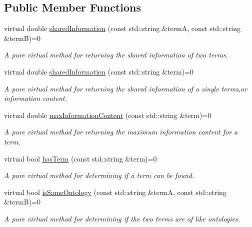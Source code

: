 \subsection*{Public Member Functions}
\begin{DoxyCompactItemize}
\item 
virtual double \hyperlink{classSharedInformationInterface_a76e8858eb598442b86b0fd3be1c519e7}{shared\+Information} (const std\+::string \&termA, const std\+::string \&termB)=0
\begin{DoxyCompactList}\small\item\em A pure virtual method for returning the shared information of two terms. \end{DoxyCompactList}\item 
virtual double \hyperlink{classSharedInformationInterface_aba102c0e44fbc098baef6074f1eb37b6}{shared\+Information} (const std\+::string \&term)=0
\begin{DoxyCompactList}\small\item\em A pure virtual method for returning the shared information of a single terms,or information content. \end{DoxyCompactList}\item 
virtual double \hyperlink{classSharedInformationInterface_a7356ba99509458777972ce0f00ebd999}{max\+Information\+Content} (const std\+::string \&term)=0
\begin{DoxyCompactList}\small\item\em A pure virtual method for returning the maximum information content for a term. \end{DoxyCompactList}\item 
virtual bool \hyperlink{classSharedInformationInterface_a3f056cf6a40eea8c1669108087dcd5c8}{has\+Term} (const std\+::string \&term)=0
\begin{DoxyCompactList}\small\item\em A pure virtual method for determining if a term can be found. \end{DoxyCompactList}\item 
virtual bool \hyperlink{classSharedInformationInterface_a607463b9736df9c4b8ec3ba9fe41c19d}{is\+Same\+Ontology} (const std\+::string \&termA, const std\+::string \&termB)=0
\begin{DoxyCompactList}\small\item\em A pure virtual method for determining if the two terms are of like ontologies. \end{DoxyCompactList}\end{DoxyCompactItemize}


